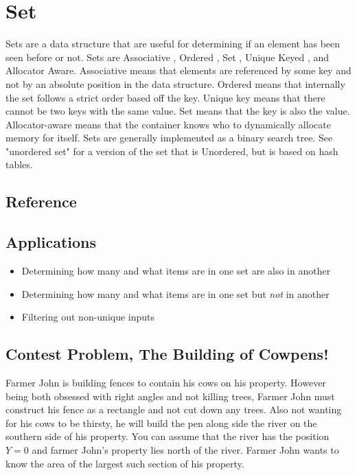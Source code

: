 \section{Set}
Sets are a data structure that are useful for determining if an element has been seen before or not.
Sets are Associative , Ordered , Set , Unique Keyed , and Allocator Aware\cite{cplusplus}.
Associative means that elements are referenced by some key and not by an absolute position in the data structure.
Ordered means that internally the set follows a strict order based off the key.
Unique key means that there cannot be two keys with the same value.
Set means that the key is also the value.
Allocator-aware means that the container knows who to dynamically allocate memory for itself.
Sets are generally implemented as a binary search tree.
See "unordered set" for a version of the set that is Unordered, but is based on hash tables.

\subsection{Reference}


\subsection{Applications}
\begin{itemize}
    \item   Determining how many and what items are in one set are also in another
    \item   Determining how many and what items are in one set but \emph{not} in another
    \item   Filtering out non-unique inputs
\end{itemize}

\subsection{Contest Problem, The Building of Cowpens!}
Farmer John is building fences to contain his cows on his property.
However being both obsessed with right angles and not killing trees, Farmer John must construct his fence as a rectangle and not cut down any trees.
Also not wanting for his cows to be thirsty, he will build the pen along side the river on the southern side of his property.
You can assume that the river has the position $Y=0$ and farmer John's property lies north of the river.
Farmer John wants to know the area of the largest such section of his property.
